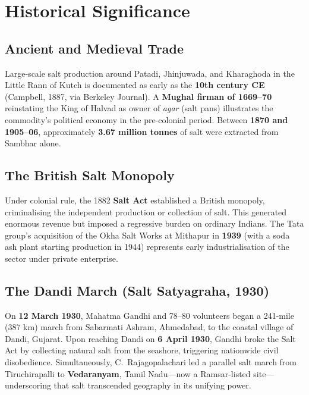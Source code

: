 \documentclass[12pt,a4paper]{article}
\begin{document}
\section{Historical Significance}

\subsection{Ancient and Medieval Trade}

Large-scale salt production around Patadi, Jhinjuwada, and Kharaghoda in the Little
Rann of Kutch is documented as early as the \textbf{10th century CE} (Campbell, 1887,
via Berkeley Journal). A \textbf{Mughal firman of 1669--70} reinstating the King of
Halvad as owner of \textit{agar} (salt pans) illustrates the commodity's political
economy in the pre-colonial period. Between \textbf{1870 and 1905--06}, approximately
\textbf{3.67 million tonnes} of salt were extracted from Sambhar alone.

\subsection{The British Salt Monopoly}

Under colonial rule, the 1882 \textbf{Salt Act} established a British monopoly,
criminalising the independent production or collection of salt. This generated enormous
revenue but imposed a regressive burden on ordinary Indians. The Tata group's acquisition
of the Okha Salt Works at Mithapur in \textbf{1939} (with a soda ash plant starting
production in 1944) represents early industrialisation of the sector under private enterprise.

\subsection{The Dandi March (Salt Satyagraha, 1930)}

On \textbf{12 March 1930}, Mahatma Gandhi and 78--80 volunteers began a 241-mile
(387 km) march from Sabarmati Ashram, Ahmedabad, to the coastal village of Dandi,
Gujarat. Upon reaching Dandi on \textbf{6 April 1930}, Gandhi broke the Salt Act by
collecting natural salt from the seashore, triggering nationwide civil disobedience.
Simultaneously, C.\ Rajagopalachari led a parallel salt march from Tiruchirapalli to
\textbf{Vedaranyam}, Tamil Nadu—now a Ramsar-listed site—underscoring that salt
transcended geography in its unifying power.
\end{document}
